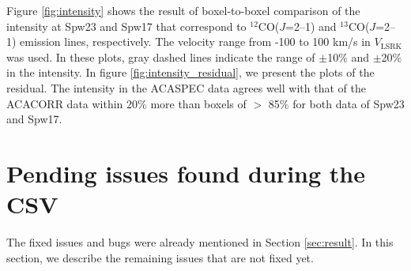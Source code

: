 Figure \ref{fig:intensity} shows the result of boxel-to-boxel comparison of the intensity at Spw23 and Spw17 that correspond to $^{12}$CO($J$=2--1) and $^{13}$CO($J$=2--1) emission lines, respectively. The velocity range from -100 to 100 km/s in $V_{\mathrm{LSRK}}$ was used. In these plots, gray dashed lines indicate the range of $\pm$10\% and $\pm$20\% in the intensity. 
In figure \ref{fig:intensity_residual}, we present the plots of the residual. 
The intensity in the ACASPEC data agrees well with that of the ACACORR data within 20\% more than boxels of $>$ 85\% for both data of Spw23 and Spw17. 


\section{Pending issues found during the CSV}\label{sec:issue}
The fixed issues and bugs were already mentioned in Section \ref{sec:result}. In this section, we describe the remaining issues that are not fixed yet. 

